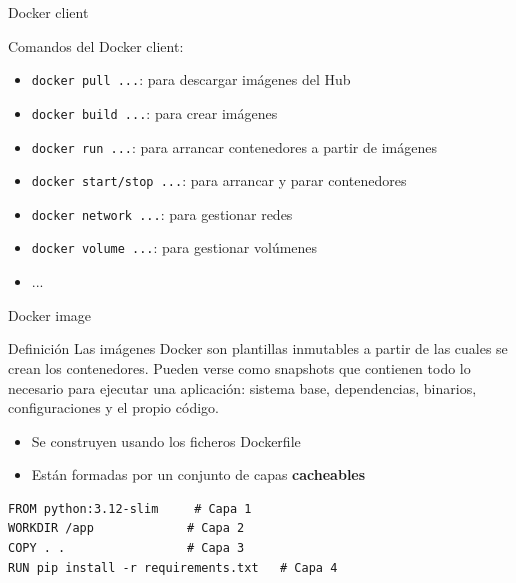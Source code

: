 \documentclass{beamer}
\begin{document}
\begin{frame}{Docker client}

Comandos del Docker client:

\begin{itemize}
    \item \texttt{docker pull ...}: para descargar imágenes del Hub
    \item \texttt{docker build ...}: para crear imágenes
    \item \texttt{docker run ...}: para arrancar contenedores a partir de imágenes
    \item \texttt{docker start/stop ...}: para arrancar y parar contenedores
    \item \texttt{docker network ...}: para gestionar redes
    \item \texttt{docker volume ...}: para gestionar volúmenes
    \item ...
\end{itemize}
    
\end{frame}

\begin{frame}[fragile]{Docker image}

\begin{block}{Definición}
Las imágenes Docker son plantillas inmutables a partir de las cuales se crean los contenedores.
Pueden verse como snapshots que contienen todo lo necesario para ejecutar una aplicación: sistema base, dependencias, binarios, configuraciones y el propio código.
\end{block}

\begin{itemize}
    \item Se construyen usando los ficheros Dockerfile
    \item Están formadas por un conjunto de capas \textbf{cacheables}
    
\end{itemize}

\begin{verbatim}
FROM python:3.12-slim     # Capa 1
WORKDIR /app             # Capa 2 
COPY . .                 # Capa 3 
RUN pip install -r requirements.txt   # Capa 4
\end{verbatim}

    
\end{frame}
\end{document}
